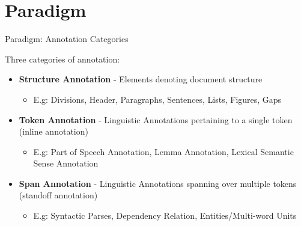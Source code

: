 \documentclass[compress]{beamer}
\begin{document}
        

\section{Paradigm}

\begin{frame}
    \begin{block}{Paradigm: Annotation Categories}
            
        
        Three categories of annotation:    
        \begin{itemize}            
            \item \textbf{Structure Annotation} - Elements denoting document structure
            \begin{itemize}
                \item {\footnotesize E.g: Divisions, Header, Paragraphs, Sentences, Lists, Figures, Gaps }
            \end{itemize}
            \item \textbf{Token Annotation} - Linguistic Annotations pertaining to a single token (inline annotation)
            \begin{itemize}
                \item {\footnotesize E.g: Part of Speech Annotation, Lemma Annotation, Lexical Semantic Sense Annotation }
            \end{itemize}
            \item \textbf{Span Annotation} - Linguistic Annotations spanning over multiple tokens (standoff annotation)
            \begin{itemize}
                \item {\footnotesize E.g: Syntactic Parses, Dependency Relation, Entities/Multi-word Units}
            \end{itemize}
        \end{itemize}
            
    \end{block}
\end{frame}
\end{document}
